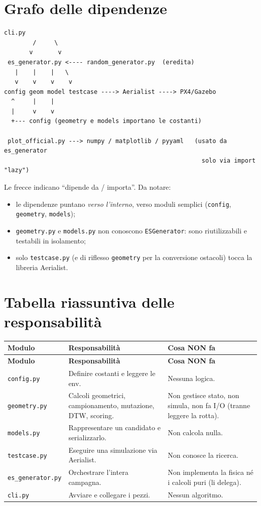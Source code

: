 \documentclass[11pt,a4paper]{report}
\newcommand{\code}[1]{\texttt{#1}}
\begin{document}
\section{Grafo delle dipendenze}
\begin{lstlisting}[style=ascii]
        cli.py
        /     \
       v       v
 es_generator.py <---- random_generator.py  (eredita)
   |    |    |   \
   v    v    v    v
config geom model testcase ----> Aerialist ----> PX4/Gazebo
  ^     |    |
  |     v    v
  +--- config (geometry e models importano le costanti)

 plot_official.py ---> numpy / matplotlib / pyyaml   (usato da es_generator
                                                       solo via import "lazy")
\end{lstlisting}
Le frecce indicano ``dipende da / importa''. Da notare:
\begin{itemize}
  \item le dipendenze puntano \emph{verso l'interno}, verso moduli
        semplici (\code{config}, \code{geometry}, \code{models});
  \item \code{geometry.py} e \code{models.py} non conoscono
        \code{ESGenerator}: sono riutilizzabili e testabili in
        isolamento;
  \item solo \code{testcase.py} (e di riflesso \code{geometry} per la
        conversione ostacoli) tocca la libreria Aerialist.
\end{itemize}

\section{Tabella riassuntiva delle responsabilità}
\begin{longtable}{L{3.4cm} L{4.2cm} L{6.4cm}}
\toprule
\textbf{Modulo} & \textbf{Responsabilità} & \textbf{Cosa NON fa}\\
\midrule
\endfirsthead
\toprule
\textbf{Modulo} & \textbf{Responsabilità} & \textbf{Cosa NON fa}\\
\midrule
\endhead
\code{config.py} & Definire costanti e leggere le env. & Nessuna logica.\\
\code{geometry.py} & Calcoli geometrici, campionamento, mutazione, DTW, scoring. & Non gestisce stato, non simula, non fa I/O (tranne leggere la rotta).\\
\code{models.py} & Rappresentare un candidato e serializzarlo. & Non calcola nulla.\\
\code{testcase.py} & Eseguire una simulazione via Aerialist. & Non conosce la ricerca.\\
\code{es\_generator.py} & Orchestrare l'intera campagna. & Non implementa la fisica né i calcoli puri (li delega).\\
\code{cli.py} & Avviare e collegare i pezzi. & Nessun algoritmo.\\
\bottomrule
\end{longtable}
\end{document}
